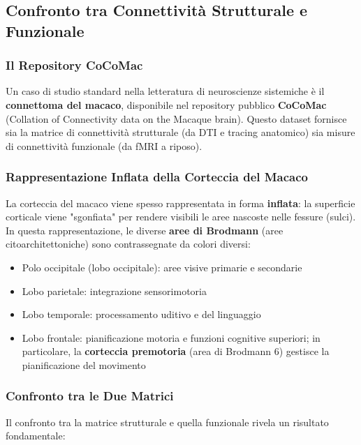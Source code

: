\subsection{Confronto tra Connettività Strutturale e Funzionale}

\subsubsection{Il Repository CoCoMac}

Un caso di studio standard nella letteratura di neuroscienze sistemiche è il \textbf{connettoma del macaco}, disponibile nel repository pubblico \textbf{CoCoMac} (Collation of Connectivity data on the Macaque brain). Questo dataset fornisce sia la matrice di connettività strutturale (da DTI e tracing anatomico) sia misure di connettività funzionale (da fMRI a riposo).

\subsubsection{Rappresentazione Inflata della Corteccia del Macaco}

La corteccia del macaco viene spesso rappresentata in forma \textbf{inflata}: la superficie corticale viene "sgonfiata" per rendere visibili le aree nascoste nelle fessure (sulci). In questa rappresentazione, le diverse \textbf{aree di Brodmann} (aree citoarchitettoniche) sono contrassegnate da colori diversi:

\begin{itemize}
    \item Polo occipitale (lobo occipitale): aree visive primarie e secondarie
    \item Lobo parietale: integrazione sensorimotoria
    \item Lobo temporale: processamento uditivo e del linguaggio
    \item Lobo frontale: pianificazione motoria e funzioni cognitive superiori; in particolare, la \textbf{corteccia premotoria} (area di Brodmann 6) gestisce la pianificazione del movimento
\end{itemize}

\subsubsection{Confronto tra le Due Matrici}

Il confronto tra la matrice strutturale e quella funzionale rivela un risultato fondamentale:

